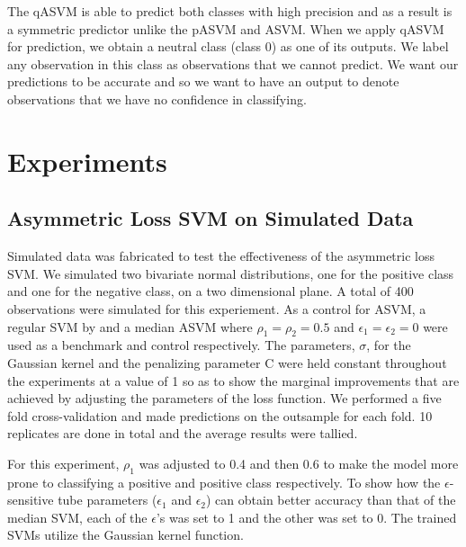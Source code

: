 \documentclass[twoside,11pt]{article}
\begin{document}
The qASVM is able to predict both classes with high precision and as a result is a symmetric predictor unlike the pASVM and ASVM. When we apply qASVM for prediction, we obtain a neutral class (class 0) as one of its outputs. We label any observation in this class as observations that we cannot predict. We want our predictions to be accurate and so we want to have an output to denote observations that we have no confidence in classifying.

\section{Experiments}
\subsection{Asymmetric Loss SVM on Simulated Data}\label{simulation}
Simulated data was fabricated to test the effectiveness of the asymmetric loss SVM. We simulated two bivariate normal distributions, one for the positive class and one for the negative class, on a two dimensional plane. A total of 400 observations were simulated for this experiement. As a control for ASVM, a regular SVM by \citet{Vapnik98} and a median ASVM where $\rho_1=\rho_2=0.5$ and $\epsilon_1=\epsilon_2=0$ were used as a benchmark and control respectively. The parameters, $\sigma$, for the Gaussian kernel and the penalizing parameter C were held constant throughout the experiments at a value of 1 so as to show the marginal improvements that are achieved by adjusting the parameters of the loss function. We performed a five fold cross-validation and made predictions on the outsample for each fold. 10 replicates are done in total and the average results were tallied. 

 For this experiment, $\rho_1$ was adjusted to 0.4 and then 0.6 to make the model more prone to classifying a positive and positive class respectively. To show how the $\epsilon$-sensitive tube parameters ($\epsilon_1$ and $\epsilon_2$) can obtain better accuracy than that of the median SVM, each of the $\epsilon$'s was set to 1 and the other was set to 0. The trained SVMs utilize the Gaussian kernel function. 
\end{document}
